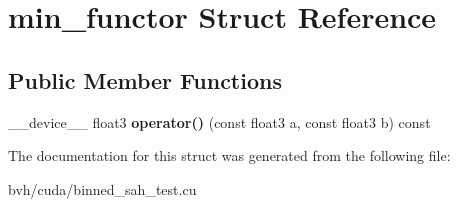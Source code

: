 \hypertarget{structmin__functor}{
\section{min\-\_\-functor \-Struct \-Reference}
\label{structmin__functor}
}
\subsection*{\-Public \-Member \-Functions}
\begin{DoxyCompactItemize}
\item 
\hypertarget{structmin__functor_af2ab665d5e7fff75fa72a575037a2435}{
\-\_\-\-\_\-device\-\_\-\-\_\- float3 {\bfseries operator()} (const float3 a, const float3 b) const }
\label{structmin__functor_af2ab665d5e7fff75fa72a575037a2435}

\end{DoxyCompactItemize}


\-The documentation for this struct was generated from the following file\-:\begin{DoxyCompactItemize}
\item 
bvh/cuda/binned\-\_\-sah\-\_\-test.\-cu\end{DoxyCompactItemize}
